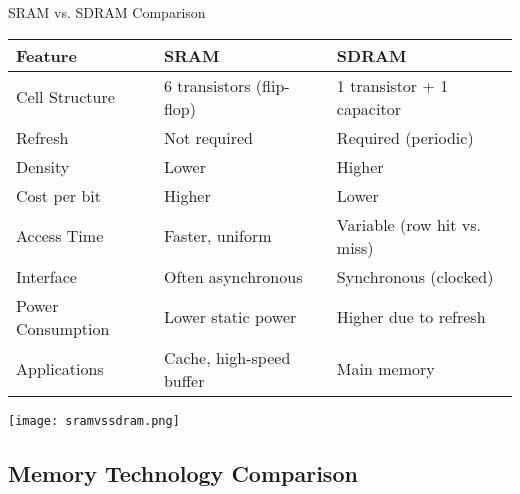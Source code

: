 \begin{corollary}{SRAM vs. SDRAM Comparison}
\begin{center}
\begin{tabular}{|p{3cm}|p{4cm}|p{4cm}|}
\hline
\textbf{Feature} & \textbf{SRAM} & \textbf{SDRAM} \\
\hline
Cell Structure & 6 transistors (flip-flop) & 1 transistor + 1 capacitor \\
\hline
Refresh & Not required & Required (periodic) \\
\hline
Density & Lower & Higher \\
\hline
Cost per bit & Higher & Lower \\
\hline
Access Time & Faster, uniform & Variable (row hit vs. miss) \\
\hline
Interface & Often asynchronous & Synchronous (clocked) \\
\hline
Power Consumption & Lower static power & Higher due to refresh \\
\hline
Applications & Cache, high-speed buffer & Main memory \\
\hline
\end{tabular}
\end{center}

\texttt{[image: sramvssdram.png]}
\end{corollary}


\subsection{Memory Technology Comparison}




